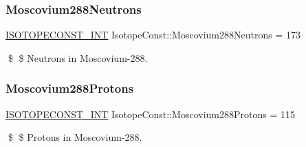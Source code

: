 \subsubsection{\texorpdfstring{Moscovium288\+Neutrons}{Moscovium288Neutrons}}
{\footnotesize\ttfamily \mbox{\hyperlink{group___isotope_const-_macros_ga5f18360b3e99483a35c32d789e62621c}{I\+S\+O\+T\+O\+P\+E\+C\+O\+N\+S\+T\+\_\+\+I\+NT}} Isotope\+Const\+::\+Moscovium288\+Neutrons = 173}

\$ \$ Neutrons in Moscovium-\/288. \mbox{\label{group___isotope_const-_moscovium-_mc288_gaa31161fedc034ee6253697f239ef4078}} 
\subsubsection{\texorpdfstring{Moscovium288\+Protons}{Moscovium288Protons}}
{\footnotesize\ttfamily \mbox{\hyperlink{group___isotope_const-_macros_ga5f18360b3e99483a35c32d789e62621c}{I\+S\+O\+T\+O\+P\+E\+C\+O\+N\+S\+T\+\_\+\+I\+NT}} Isotope\+Const\+::\+Moscovium288\+Protons = 115}

\$ \$ Protons in Moscovium-\/288. 